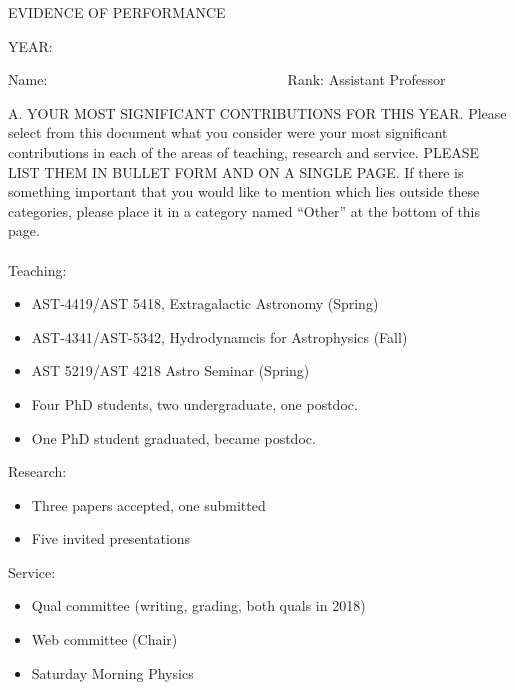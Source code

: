 \addtolength{\topmargin}{-.5in}
\addtolength{\textheight}{2.5cm}
\addtolength{\oddsidemargin}{-.75in}
\addtolength{\evensidemargin}{-.75in}
\addtolength{\textwidth}{.5in}


\centerline{EVIDENCE OF PERFORMANCE}
\bigskip
\centerline{YEAR: }
\bigskip
\noindent Name: 
\hbox{\ \ \ \ \ \ \ \
\ \ \ \ \ \ \ \ \ \ \ \ \ \ \ \ \ \ \ \ \ \ \ \ \ }
Rank: \underbar
{Assistant Professor }

\vskip 20pt

\noindent A. YOUR MOST SIGNIFICANT CONTRIBUTIONS FOR THIS YEAR.
Please select from this document what you consider were your most
significant contributions in each of the areas of teaching, research
and service. PLEASE LIST THEM IN BULLET FORM AND ON A SINGLE PAGE.
If there is something important that you would like to mention which
lies outside these categories, please
place it in a category named ``Other'' at the bottom of this page. \\ \\

\noindent
Teaching:

\begin{itemize}
\item AST-4419/AST 5418, Extragalactic Astronomy (Spring) 
\item AST-4341/AST-5342, Hydrodynamcis for Astrophysics (Fall)
\item AST 5219/AST 4218 Astro Seminar (Spring)
\item Four PhD students, two undergraduate, one postdoc.
\item One PhD student graduated, became postdoc.
\end{itemize}


\noindent
Research:

\begin{itemize}
    \item Three papers accepted, one submitted
    \item Five invited presentations
\end{itemize}


\noindent
Service:

\begin{itemize}
\item Qual committee (writing, grading, both quals in 2018)
\item Web committee (Chair)
\item Saturday Morning Physics
\end{itemize}



